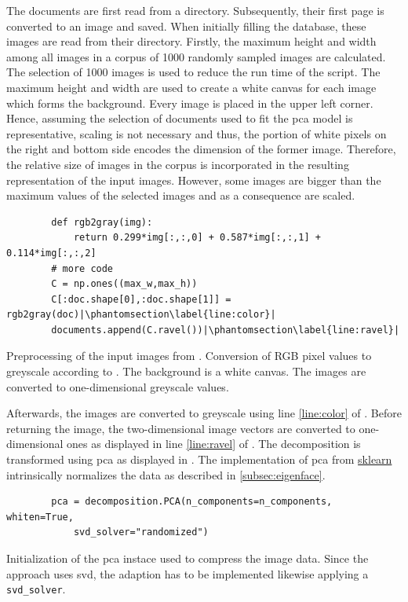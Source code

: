 The documents are first read from a directory. 
Subsequently, their first page is converted to an image and saved.
When initially filling the database, these images are read from their directory.
Firstly, the maximum height and width among all images in a corpus of 1000 randomly sampled images are calculated.
The selection of 1000 images is used to reduce the run time of the script.
The maximum height and width are used to create a white canvas for each image which forms the background.
Every image is placed in the upper left corner.
Hence, assuming the selection of documents used to fit the \ac{pca} model is representative, 
scaling is not necessary and thus, the portion of white pixels on the right and bottom side encodes the dimension of the former image.
Therefore, the relative size of images in the corpus is incorporated in the resulting representation of the input images.
However, some images are bigger than the maximum values of the selected images and as a consequence are scaled.

\begin{listing}[htp]
    \begin{verbatim}
        def rgb2gray(img):
            return 0.299*img[:,:,0] + 0.587*img[:,:,1] + 0.114*img[:,:,2]
        # more code
        C = np.ones((max_w,max_h))
        C[:doc.shape[0],:doc.shape[1]] = rgb2gray(doc)|\phantomsection\label{line:color}|
        documents.append(C.ravel())|\phantomsection\label{line:ravel}|
    \end{verbatim}
    \caption[Preprocessing of the input images]{Preprocessing of the input images from \thesissupervisor{}.
    Conversion of RGB pixel values to greyscale according to \cite{RGB2Grey}.
    The background is a white canvas.
    The images are converted to one-dimensional greyscale values.}
    \label{lst:preproc_images}
\end{listing}

Afterwards, the images are converted to greyscale using line \ref{line:color} of .
Before returning the image, the two-dimensional image vectors are converted to one-dimensional ones as displayed in line \ref{line:ravel} of .
The decomposition is transformed using \ac{pca} as displayed in .
The implementation of \ac{pca} from \href{https://scikit-learn.org/stable/modules/generated/sklearn.decomposition.PCA.html}{sklearn} 
intrinsically normalizes the data as described in \autoref{subsec:eigenface}.%

\begin{listing}[htp]
    \begin{verbatim}
        pca = decomposition.PCA(n_components=n_components, whiten=True, 
            svd_solver="randomized")
    \end{verbatim}
    \caption[Initialization of the \ac{pca} instace]{Initialization of the \ac{pca} instace used to compress the image data.
    Since the \eigenfaces{} approach uses \ac{svd}, the adaption \eigendocs{} has to be implemented likewise applying a \texttt{svd\_solver}.
    }
    \label{lst:pca_svd}
\end{listing}



